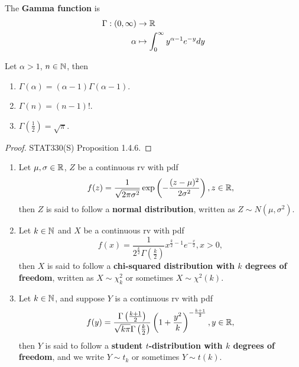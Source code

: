 \documentclass[11pt,fleqn]{book} %
\begin{document}
\begin{definition} \label{def:113}
The \textbf{Gamma function} is
\[
\begin{aligned}
\Gamma: (0, \infty) &\rightarrow \mathbb{R} \\
\alpha &\mapsto \int_0^\infty y^{\alpha - 1}e^{-y}dy
\end{aligned}
\]
\end{definition}

\begin{proposition} \label{prop:114}
Let \(\alpha > 1\), \(n \in \mathbb{N}\), then
\begin{enumerate}
\item \(\Gamma(\alpha) = (\alpha - 1)\Gamma(\alpha - 1)\).
\item \(\Gamma(n) = (n - 1)!\).
\item \(\Gamma\left(\frac12\right) = \sqrt\pi\).
\end{enumerate}
\end{proposition}
\begin{proof} STAT330(S) Proposition 1.4.6.\end{proof}

\begin{definition} \label{def:115}
\begin{enumerate}
\item Let \(\mu, \sigma \in \mathbb{R}\), \(Z\) be a continuous rv with pdf
\[
f(z) = \frac{1}{\sqrt{2\pi\sigma^2}}\exp\left(-\frac{(z - \mu)^2}{2\sigma^2}\right), z \in \mathbb{R},
\]
then \(Z\) is said to follow a \textbf{normal distribution}, written as \(Z \sim N(\mu, \sigma^2)\).
\item Let \(k \in \mathbb{N}\) and \(X\) be a continuous rv with pdf
\[
f(x) = \frac{1}{2^{\frac{k}{2}}\Gamma\left(\frac k 2\right)} x^{\frac{k}{2} - 1} e^{-\frac{x}{2}}, x > 0,
\]
then \(X\) is said to follow a \textbf{chi-squared distribution with \(k\) degrees of freedom}, written as \(X \sim \chi^2_k\) or sometimes \(X \sim \chi^2(k)\).
\item Let \(k \in \mathbb{N}\), and suppose \(Y\) is a continuous rv with pdf
\[
f(y) = \frac{\Gamma\left(\frac{k+1}{2}\right)}{\sqrt{k\pi}\Gamma\left(\frac{k}{2}\right)}\left(1 + \frac{y^2}{k}\right)^{-\frac{k+1}{2}}, y \in \mathbb{R},
\]
then \(Y\) is said to follow a \textbf{student \(t\)-distribution with \(k\) degrees of freedom}, and we write \(Y \sim t_k\) or sometimes \(Y \sim t(k)\).
\end{enumerate}
\end{definition}
\end{document}
